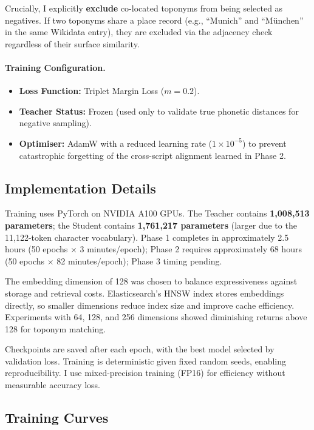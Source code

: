 \documentclass[11pt,a4paper]{article}
\newcommand{\embdim}{128}
\begin{document}
Crucially, I explicitly \textbf{exclude} co-located toponyms from being selected as negatives. If two toponyms share a place record (e.g., ``Munich'' and ``München'' in the same Wikidata entry), they are excluded via the adjacency check regardless of their surface similarity.

\paragraph{Training Configuration.}
\begin{itemize}
    \item \textbf{Loss Function:} Triplet Margin Loss ($m=0.2$).
    \item \textbf{Teacher Status:} Frozen (used only to validate true phonetic distances for negative sampling).
    \item \textbf{Optimiser:} AdamW with a reduced learning rate ($1 \times 10^{-5}$) to prevent catastrophic forgetting of the cross-script alignment learned in Phase 2.
\end{itemize}

\subsection{Implementation Details}

Training uses PyTorch on NVIDIA A100 GPUs. The Teacher contains \textbf{1,008,513 parameters}; the Student contains \textbf{1,761,217 parameters} (larger due to the 11,122-token character vocabulary). Phase 1 completes in approximately 2.5 hours (50 epochs $\times$ 3 minutes/epoch); Phase 2 requires approximately 68 hours (50 epochs $\times$ 82 minutes/epoch); Phase 3 timing pending.

The embedding dimension of \embdim{} was chosen to balance expressiveness against storage and retrieval costs. Elasticsearch's HNSW index stores embeddings directly, so smaller dimensions reduce index size and improve cache efficiency. Experiments with 64, 128, and 256 dimensions showed diminishing returns above 128 for toponym matching.

Checkpoints are saved after each epoch, with the best model selected by validation loss. Training is deterministic given fixed random seeds, enabling reproducibility. I use mixed-precision training (FP16) for efficiency without measurable accuracy loss.

\subsection{Training Curves}
\end{document}
